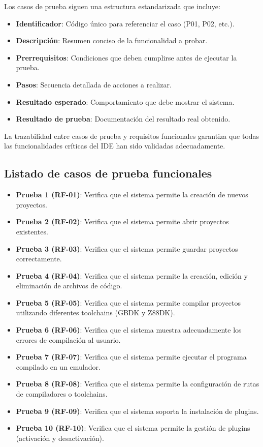 \documentclass[../../main.tex]{subfiles}
\begin{document}
Los casos de prueba siguen una estructura estandarizada que incluye:
\begin{itemize}
\item \textbf{Identificador}: Código único para referenciar el caso (P01, P02, etc.).
\item \textbf{Descripción}: Resumen conciso de la funcionalidad a probar.
\item \textbf{Prerrequisitos}: Condiciones que deben cumplirse antes de ejecutar la prueba.
\item \textbf{Pasos}: Secuencia detallada de acciones a realizar.
\item \textbf{Resultado esperado}: Comportamiento que debe mostrar el sistema.
\item \textbf{Resultado de prueba}: Documentación del resultado real obtenido.
\end{itemize}

La trazabilidad entre casos de prueba y requisitos funcionales garantiza que todas las funcionalidades críticas del IDE han sido validadas adecuadamente.

\clearpage

\subsection{Listado de casos de prueba funcionales}
\begin{itemize}
    \item \textbf{Prueba 1 (RF-01)}: Verifica que el sistema permite la creación de nuevos proyectos.
    \item \textbf{Prueba 2 (RF-02)}: Verifica que el sistema permite abrir proyectos existentes.
    \item \textbf{Prueba 3 (RF-03)}: Verifica que el sistema permite guardar proyectos correctamente.
    \item \textbf{Prueba 4 (RF-04)}: Verifica que el sistema permite la creación, edición y eliminación de archivos de código.
    \item \textbf{Prueba 5 (RF-05)}: Verifica que el sistema permite compilar proyectos utilizando diferentes toolchains (GBDK y Z88DK).
    \item \textbf{Prueba 6 (RF-06)}: Verifica que el sistema muestra adecuadamente los errores de compilación al usuario.
    \item \textbf{Prueba 7 (RF-07)}: Verifica que el sistema permite ejecutar el programa compilado en un emulador.
    \item \textbf{Prueba 8 (RF-08)}: Verifica que el sistema permite la configuración de rutas de compiladores o toolchains.
    \item \textbf{Prueba 9 (RF-09)}: Verifica que el sistema soporta la instalación de plugins.
    \item \textbf{Prueba 10 (RF-10)}: Verifica que el sistema permite la gestión de plugins (activación y desactivación).
\end{itemize}
\end{document}
